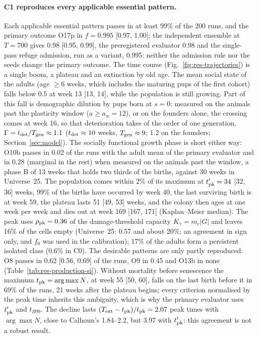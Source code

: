 \paragraph{\textsf{C1} reproduces every applicable essential pattern.}
Each applicable essential pattern passes in at least 99\% of the 200 runs, and the primary outcome O17p in
$f=0.995$ [0.97, 1.00]; the independent ensemble at $T=700$ gives 0.98 [0.95, 0.99], the preregistered evaluator 0.98
and the single-pass refuge admission, run as a variant, 0.995: neither the admission rule nor the
seeds change the primary outcome.
The time course (Fig.~\ref{fig:res-trajectories}) is a single boom, a plateau and an extinction by old age. The
mean social state of the adults (age $\ge6$ weeks, which includes the maturing pups of the first cohort) falls below
0.5 at week 13 [13, 14], while the population is still growing. Part of this fall is demographic dilution by pups
born at $s=0$: measured on the animals past the plasticity window ($a\ge a_w=12$), or on the founders alone, the
crossing comes at week 16, so that deterioration takes of the order of one generation, $\Gamma=t_{\rm det}/T_{\rm gen}\approx1.1$
($t_{\rm det}\approx10$ weeks, $T_{\rm gen}\approx9$; 1.2 on the founders; Section~\ref{sec:model}). The socially
functional growth phase is short either way: O10b passes in 0.02 of the runs with the adult mean of the primary
evaluator and in 0.28 (marginal in the rest) when measured on the animals past the window, a phase B of 13 weeks
that holds two thirds of the births, against 30 weeks in Universe~25. The population comes within 2\% of
its maximum at $t'_{\rm pk}=34$ [32, 36] weeks, 99\% of the births have occurred by week 40, the last surviving
birth is at week 59, the plateau lasts 51 [49, 53] weeks, and the colony then ages at one week per week and dies
out at week 169 [167, 171] (Kaplan--Meier median). The peak uses $\rho_{\rm pk}=0.36$ of the damage-threshold
capacity $K_\gamma=m_c|G|$ and leaves 16\% of the cells empty (Universe~25: 0.57 and about 20\%; an agreement in
sign only, and $f_0$ was used in the calibration); 17\% of the adults form a persistent isolated class (0.6\% in
\textsf{C0}). The desirable patterns are only partly reproduced: O8 passes in 0.62 [0.56, 0.69] of the runs, O9 in
0.45 and O13b in none (Table~\ref{tab:res-production-si}).
Without mortality before senescence the maximum $t_{\rm pk}=\arg\max N$, at week 55 [50, 60], falls on the last
birth before it in 69\% of the runs, 21 weeks after the plateau begins; every criterion normalised by the peak
time inherits this ambiguity, which is why the primary evaluator uses $t'_{\rm pk}$ and $t_{B99}$. The decline
lasts $(T_{\rm ext}-t_{\rm pk})/t_{\rm pk}=2.07$ peak times with $\arg\max N$, close to Calhoun's 1.84--2.2, but
3.97 with $t'_{\rm pk}$: this agreement is not a robust result.

